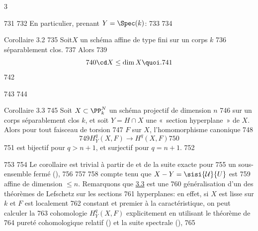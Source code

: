 3	\documentclass[10pt]{../fichiers-configuration-latex/smfart}
\begin{document}
   731	
   732	En particulier, prenant $Y=\Spec(k)$:
   733	
   734	\begin{enonce*}{Corollaire 3.2}
   735	Soit\pageoriginale $X$ un schéma affine de type fini sur un corps $k$
   736	séparablement clos. 
   737	Alors
   739	$$
   740	\cd X\leq \dim X{\quoi}.
   741	$$
   742	\end{enonce*}
   743	
   744	\begin{enonce*}{Corollaire 3.3}
   745	Soit $X\subset \PP^N_k$ un schéma projectif de dimension $n$
   746	sur un corps séparablement clos $k$, et soit $Y=H\cap X$ une « section hyperplane »  de $X$. Alors pour tout faisceau de torsion
   747	$F$ sur $X$, l'homomorphisme canonique
   748	$$
   749	H^{q}_Y(X,F)\longrightarrow H^{q}(X,F)
   750	$$
   751	est bijectif pour $q>n+1$, et surjectif pour $q=n+1$.
   752	\end{enonce*}
   753	
   754	Le corollaire est trivial à partir de  et de la suite exacte pour
   755	un sous-ensemble fermé (), 
   756	%
   757	%
   758	compte tenu que $X-Y=\sisi{\mathcal{U}}{U}$ est
   759	affine de dimension $\leq n$. Remarquons que \hyperref[XIV.cor3.3]{3.3} est une
   760	généralisation d'un des théorèmes de Lefschetz sur les sections
   761	hyperplanes: en effet, si $X$ est lisse sur $k$ et $F$ est localement
   762	constant et premier à la caractéristique, on peut calculer la
   763	cohomologie $H^{q}_Y(X,F)$ explicitement en utilisant le théorème de
   764	pureté cohomologique relatif () et la suite spectrale (), 
   765	%
\end{document}
